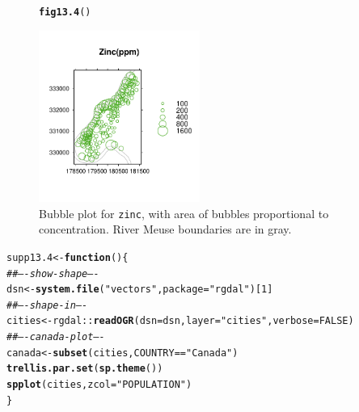 \documentclass[12pt, a4paper,  BCOR=8.25mm, DIV=15]{scrartcl}\usepackage[]{graphicx}\usepackage[]{color}
\makeatletter
\newcommand{\hlnum}[1]{\textcolor[rgb]{0.686,0.059,0.569}{#1}}%
\newcommand{\hlstr}[1]{\textcolor[rgb]{0.192,0.494,0.8}{#1}}%
\newcommand{\hlcom}[1]{\textcolor[rgb]{0.678,0.584,0.686}{\textit{#1}}}%
\newcommand{\hlopt}[1]{\textcolor[rgb]{0,0,0}{#1}}%
\newcommand{\hlstd}[1]{\textcolor[rgb]{0.345,0.345,0.345}{#1}}%
\newcommand{\hlkwa}[1]{\textcolor[rgb]{0.161,0.373,0.58}{\textbf{#1}}}%
\newcommand{\hlkwb}[1]{\textcolor[rgb]{0.69,0.353,0.396}{#1}}%
\newcommand{\hlkwc}[1]{\textcolor[rgb]{0.333,0.667,0.333}{#1}}%
\newcommand{\hlkwd}[1]{\textcolor[rgb]{0.737,0.353,0.396}{\textbf{#1}}}%
\newenvironment{kframe}{%
 \def\at@end@of@kframe{}%
 \ifinner\ifhmode%
  \def\at@end@of@kframe{\end{minipage}}%
  \begin{minipage}{\columnwidth}%
 \fi\fi%
 \def\FrameCommand##1{\hskip\@totalleftmargin \hskip-\fboxsep
 \colorbox{shadecolor}{##1}\hskip-\fboxsep
     \hskip-\linewidth \hskip-\@totalleftmargin \hskip\columnwidth}%
 \MakeFramed {\advance\hsize-\width
   \@totalleftmargin\z@ \linewidth\hsize
   \@setminipage}}%
 {\par\unskip\endMakeFramed%
 \at@end@of@kframe}
\newenvironment{knitrout}{}{} %
\newcommand{\txtt}[1]{{\texttt{#1}}}
\makeatother
\begin{document}
\begin{figure}
\begin{knitrout}
\color{fgcolor}\begin{kframe}
\begin{alltt}
\hlkwd{fig13.4}\hlstd{()}
\end{alltt}
\end{kframe}

{\centering \includegraphics[width=0.47\textwidth]{figs/map-meuse-bubble-13_4-1} 

}



\end{knitrout}
 \caption{Bubble plot for \txtt{zinc},
with area of bubbles proportional to concentration.
River Meuse boundaries are in gray.\label{fig:ZnRiv}}
\end{figure}

\begin{knitrout}
\color{fgcolor}\begin{kframe}
\begin{alltt}
\hlstd{supp13.4} \hlkwb{<-} \hlkwa{function}\hlstd{()\{}
\hlcom{## ---- show-shape ----}
\hlstd{dsn} \hlkwb{<-} \hlkwd{system.file}\hlstd{(}\hlstr{"vectors"}\hlstd{,} \hlkwc{package} \hlstd{=} \hlstr{"rgdal"}\hlstd{)[}\hlnum{1}\hlstd{]}
\hlcom{## ---- shape-in ----}
\hlstd{cities} \hlkwb{<-} \hlstd{rgdal}\hlopt{::}\hlkwd{readOGR}\hlstd{(}\hlkwc{dsn}\hlstd{=dsn,} \hlkwc{layer}\hlstd{=}\hlstr{"cities"}\hlstd{,} \hlkwc{verbose}\hlstd{=}\hlnum{FALSE}\hlstd{)}
\hlcom{## ---- canada-plot ----}
\hlstd{canada} \hlkwb{<-} \hlkwd{subset}\hlstd{(cities, COUNTRY}\hlopt{==}\hlstr{"Canada"}\hlstd{)}
\hlkwd{trellis.par.set}\hlstd{(}\hlkwd{sp.theme}\hlstd{())}
\hlkwd{spplot}\hlstd{(cities,} \hlkwc{zcol}\hlstd{=}\hlstr{"POPULATION"}\hlstd{)}
\hlstd{\}}
\end{alltt}
\end{kframe}
\end{knitrout}
\end{document}
